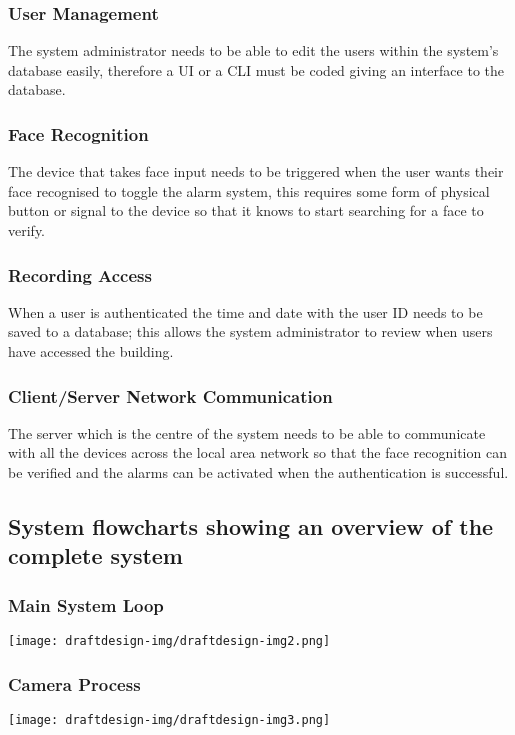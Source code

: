 \documentclass[12pt,a4paper]{report}
\begin{document}
\subsubsection[User Management]{User Management}
The system administrator needs to be able to edit the users within the system’s database easily, therefore a UI or a CLI must be coded giving an interface to the database.

\subsubsection[Face Recognition]{Face Recognition}
The device that takes face input needs to be triggered when the user wants their face recognised to toggle the alarm system, this requires some form of physical button or signal to the device so that it knows to start searching for a face to verify.

\subsubsection[Recording Access]{Recording Access}
When a user is authenticated the time and date with the user ID needs to be saved to a database; this allows the system administrator to review when users have accessed the building.

\subsubsection[Client/Server Network Communication]{Client/Server Network Communication}
The server which is the centre of the system needs to be able to communicate with all the devices across the local area network so that the face recognition can be verified and the alarms can be activated when the authentication is successful.

\subsection[System flowcharts showing an overview of the complete system]{System flowcharts showing an overview of the complete system}
\subsubsection[Main System Loop]{Main System Loop}
{\centering  \texttt{[image: draftdesign-img/draftdesign-img2.png]} \par}

\subsubsection[Camera Process]{Camera Process}
{\centering  \texttt{[image: draftdesign-img/draftdesign-img3.png]} \par}
\end{document}
